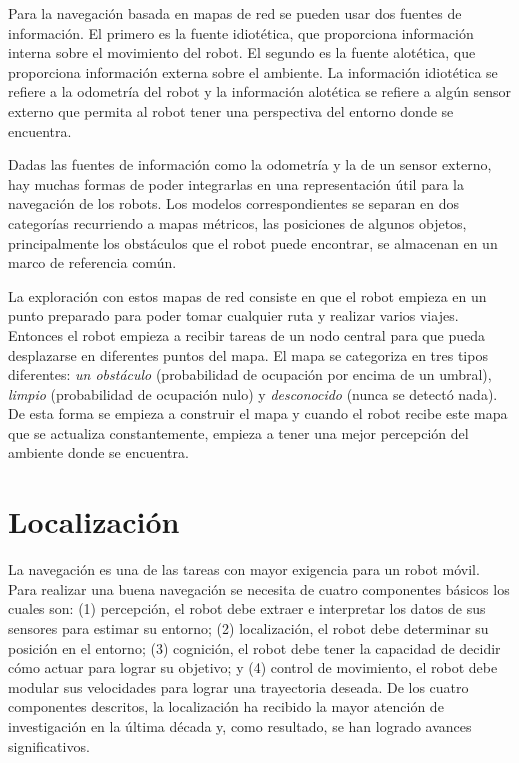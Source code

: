 Para la navegaci\'on basada en mapas de red se pueden usar dos fuentes de 
informaci\'on. El primero es la fuente idiot\'etica, que proporciona 
informaci\'on interna sobre el movimiento del robot. El segundo es la 
fuente alot\'etica, que proporciona informaci\'on externa sobre el 
ambiente. La informaci\'on idiot\'etica se refiere a la odometr\'ia 
del robot y la informaci\'on alot\'etica se refiere a alg\'un 
sensor externo que permita al robot tener una perspectiva del 
entorno donde se encuentra.

Dadas las fuentes de informaci\'on como la odometr\'ia y la de un 
sensor externo, hay muchas formas de poder integrarlas en una 
representaci\'on \'util para la navegaci\'on de los robots. Los 
modelos correspondientes se separan en dos categor\'ias recurriendo 
a mapas m\'etricos, las posiciones de algunos objetos, principalmente 
los obst\'aculos que el robot puede encontrar, se almacenan en un 
marco de referencia com\'un.

La exploraci\'on con estos mapas de red consiste en que el robot 
empieza en un punto preparado para poder tomar cualquier ruta y 
realizar varios viajes. Entonces el robot empieza a recibir tareas 
de un nodo central para que pueda desplazarse en diferentes puntos 
del mapa. El mapa se categoriza en tres tipos diferentes: 
\textit{un obst\'aculo} (probabilidad de ocupaci\'on por encima de 
un umbral), \textit{limpio} (probabilidad de ocupaci\'on nulo) y 
\textit{desconocido} (nunca se detect\'o nada). De esta forma se 
empieza a construir el mapa y cuando el robot recibe este mapa que 
se actualiza constantemente, empieza a tener una mejor percepci\'on 
del ambiente donde se encuentra.


\section{Localizaci\'on}
La navegaci\'on es una de las tareas con mayor exigencia para un robot 
m\'ovil. Para realizar una buena navegaci\'on se necesita de cuatro 
componentes b\'asicos los cuales son: (1) percepci\'on, el robot debe extraer 
e interpretar los datos de sus sensores para estimar su entorno; (2) localizaci\'on, 
el robot debe determinar su posici\'on en el entorno; 
(3) cognici\'on, el robot debe tener la capacidad de decidir c\'omo 
actuar para lograr su objetivo; y (4) control de movimiento, el 
robot debe modular sus velocidades para lograr una trayectoria deseada. De los cuatro 
componentes descritos, la localizaci\'on ha recibido la mayor atenci\'on 
de investigaci\'on en la \'ultima d\'ecada y, como resultado, se han logrado
avances significativos. %

